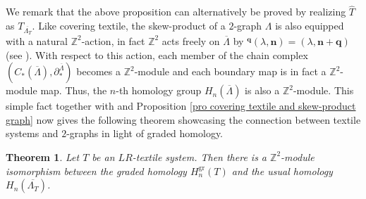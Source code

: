 \documentclass[a4paper,reqno,12pt]{amsart}
\newcommand{\N}{\mathbf{n}}
\newtheorem{thm}{Theorem}[section]
\theoremstyle{definition}
\theoremstyle{remark}
\newcommand{\gr}{\operatorname{gr}}
\begin{document}
We remark that the above proposition can alternatively be proved by realizing $\hat{T}$ as $T_{\overline{\Lambda_T}}$. Like covering textile, the skew-product of a $2$-graph $\Lambda$ is also equipped with a natural $\mathbb{Z}^2$-action, in fact $\mathbb{Z}^2$ acts freely on $\overline{\Lambda}$ by $^\mathbf{q}(\lambda,\N)=(\lambda,\N+\mathbf{q})$ (see \cite[Remark 5.6]{Kumjian-Pask}). With respect to this action, each member of the chain complex $(C_*(\overline{\Lambda}),\partial_*^{\overline{\Lambda}})$ becomes a $\mathbb{Z}^2$-module and each boundary map is in fact a $\mathbb{Z}^2$-module map. Thus, the $n$-th homology group $H_n(\overline{\Lambda})$ is also a $\mathbb{Z}^2$-module. This simple fact together with \cite[Corollary 5.13]{KPW} and Proposition \ref{pro covering textile and skew-product graph} now gives the following theorem showcasing the connection between textile systems and $2$-graphs in light of graded homology.
\begin{thm}\label{th connecting graded homology with homology of skew-product}
Let $T$ be an $LR$-textile system. Then there is a $\mathbb{Z}^2$-module isomorphism between the graded homology $H_n^{\gr}(T)$ and the usual homology $H_n(\overline{\Lambda_T})$. 
\end{thm}
\end{document}
